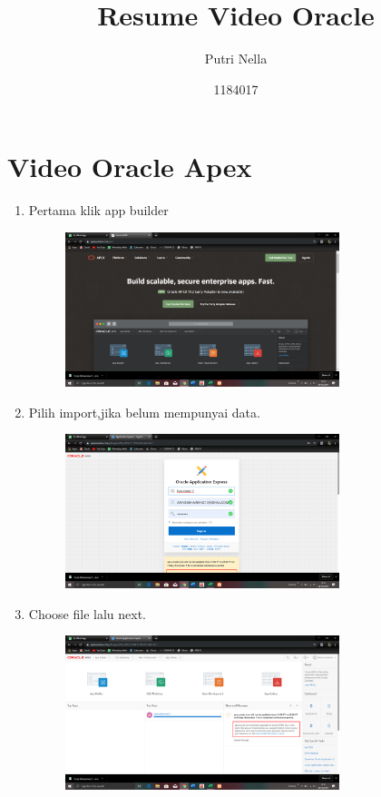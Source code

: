 \documentclass{article}
\title{Resume Video Oracle}
\author{Putri Nella}
\date{1184017}
\begin{document}
\maketitle

\section{Video Oracle Apex}
\begin{enumerate}
    \item Pertama klik app builder
    \begin{figure}[h]
            \centerline{\includegraphics[width=8cm]{image/1.PNG}}
            \end{figure}
    \item Pilih import,jika belum mempunyai data.
    \begin{figure}[h]
            \centerline{\includegraphics[width=8cm]{image/2.png}}
            \end{figure}
    \newpage\item Choose file lalu next.
    \begin{figure}[h]
            \centerline{\includegraphics[width=8cm]{image/3.png}}

\end{figure}
\end{enumerate}
\end{document}
